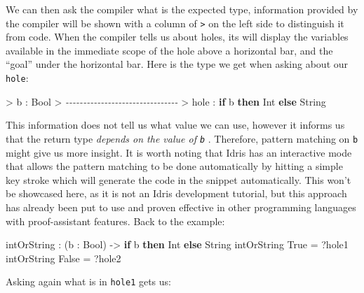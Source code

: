 \documentclass[
]{article}
\newenvironment{Shaded}{}{}
\newcommand{\CommentTok}[1]{\textcolor[rgb]{0.38,0.63,0.69}{\textit{#1}}}
\newcommand{\DataTypeTok}[1]{\textcolor[rgb]{0.56,0.13,0.00}{#1}}
\newcommand{\KeywordTok}[1]{\textcolor[rgb]{0.00,0.44,0.13}{\textbf{#1}}}
\newcommand{\NormalTok}[1]{#1}
\newcommand{\OperatorTok}[1]{\textcolor[rgb]{0.40,0.40,0.40}{#1}}
\newcommand{\OtherTok}[1]{\textcolor[rgb]{0.00,0.44,0.13}{#1}}
\begin{document}
We can then ask the compiler what is the expected type, information
provided by the compiler will be shown with a column of
\texttt{\textgreater{}} on the left side to distinguish it from code.
When the compiler tells us about holes, its will display the variables
available in the immediate scope of the hole above a horizontal bar, and
the ``goal'' under the horizontal bar. Here is the type we get when
asking about our \texttt{hole}:

\begin{Shaded}
\begin{Highlighting}[]
\OperatorTok{\textgreater{}}\NormalTok{ b }\OperatorTok{:} \DataTypeTok{Bool}
\OperatorTok{\textgreater{}} \CommentTok{{-}{-}{-}{-}{-}{-}{-}{-}{-}{-}{-}{-}{-}{-}{-}{-}{-}{-}{-}{-}{-}{-}{-}{-}{-}{-}{-}{-}{-}{-}{-}{-}}
\OperatorTok{\textgreater{}}\NormalTok{ hole }\OperatorTok{:} \KeywordTok{if}\NormalTok{ b }\KeywordTok{then} \DataTypeTok{Int} \KeywordTok{else} \DataTypeTok{String}
\end{Highlighting}
\end{Shaded}

This information does not tell us what value we can use, however it
informs us that the return type \emph{depends on the value of
\texttt{b}} . Therefore, pattern matching on \texttt{b} might give us
more insight. It is worth noting that Idris has an interactive mode that
allows the pattern matching to be done automatically by hitting a simple
key stroke which will generate the code in the snippet automatically.
This won't be showcased here, as it is not an Idris development
tutorial, but this approach has already been put to use and proven
effective in other programming languages with proof-assistant
features\cite{tdd}\cite{agda_interactive}. Back to the example:

\begin{Shaded}
\begin{Highlighting}[]
\NormalTok{intOrString }\OperatorTok{:}\NormalTok{ (b }\OperatorTok{:} \DataTypeTok{Bool}\NormalTok{) }\OtherTok{{-}\textgreater{}} \KeywordTok{if}\NormalTok{ b }\KeywordTok{then} \DataTypeTok{Int} \KeywordTok{else} \DataTypeTok{String}
\NormalTok{intOrString }\DataTypeTok{True} \OtherTok{=} \OperatorTok{?}\NormalTok{hole1}
\NormalTok{intOrString }\DataTypeTok{False} \OtherTok{=} \OperatorTok{?}\NormalTok{hole2}
\end{Highlighting}
\end{Shaded}

Asking again what is in \texttt{hole1} gets us:
\end{document}
